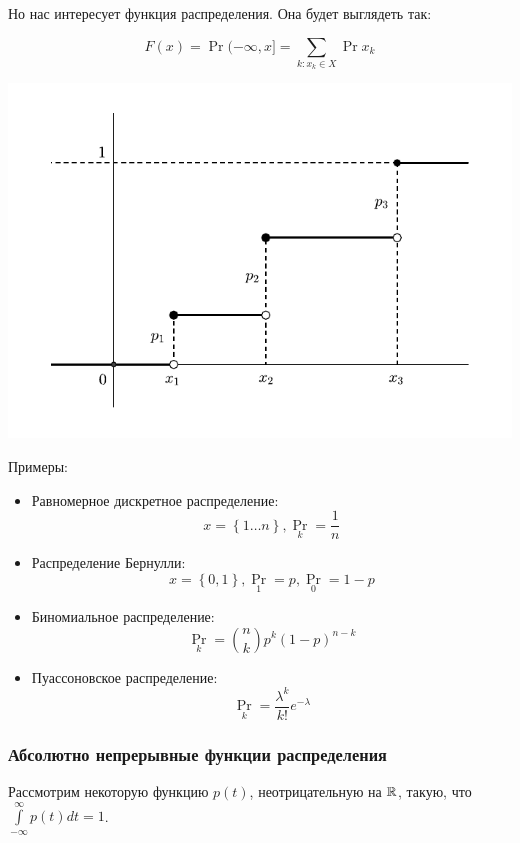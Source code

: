     Но нас интересует функция распределения. Она будет выглядеть так:

    \[
        F(x) = \Pr{(-\infty, x]} = \sum\limits_{k: x_k \in X} \Pr{x_k}
    \]

    \includegraphics[width=15cm]{main-lectures/images/Lec_8_1.pdf}

    Примеры:

    \begin{itemize}
        \item Равномерное дискретное распределение:
            \[
                x = \left\{ 1\ldots n \right\}, \Pr_k = \frac{1}{n}
            \]

        \item Распределение Бернулли:
            \[
                x = \left\{ 0, 1 \right\}, \Pr_1 = p, \Pr_0 = 1-p
            \]
        \item Биномиальное распределение:
            \[
                \Pr_k = \binom{n}{k}p^k(1-p)^{n-k}
            \]
        \item Пуассоновское распределение:
            \[
                \Pr_k = \frac{\lambda^k}{k!}e^{-\lambda}
            \]
    \end{itemize}

\subsubsection{Абсолютно непрерывные функции распределения}

    Рассмотрим некоторую функцию $p(t)$, неотрицательную на $\mathbb{R}$, такую, что
    $\int\limits_{-\infty}^{\infty} p(t)dt = 1$.

